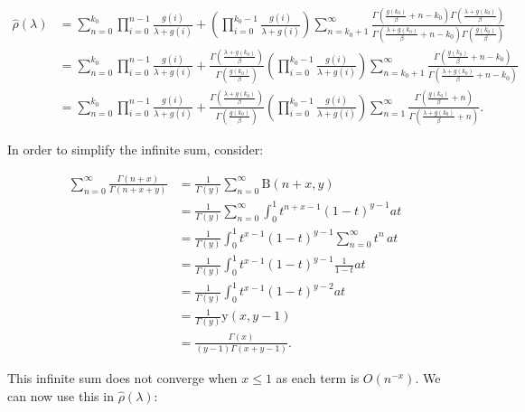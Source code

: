 \documentclass[
  sn-basic,
]{sn-jnl}
\theoremstyle{plain}
\theoremstyle{plain}
\theoremstyle{remark}
\begin{document}
\begin{align*}
\hat\rho(\lambda) &= \sum_{n=0}^{k_0}\prod_{i=0}^{n-1}\frac{g(i)}{\lambda+g(i)} + \left(\prod_{i=0}^{k_0-1}\frac{g(i)}{\lambda+g(i)}\right)\sum_{n=k_0+1}^\infty\frac{\Gamma\left(\frac{g(k_0)}{\beta}+n-k_0\right)\Gamma\left(\frac{\lambda+g(k_0)}{\beta}\right)}{\Gamma\left(\frac{\lambda+g(k_0)}{\beta}+n-k_0\right)\Gamma\left(\frac{g(k_0)}{\beta}\right)}\\
&= \sum_{n=0}^{k_0}\prod_{i=0}^{n-1}\frac{g(i)}{\lambda+g(i)} + \frac{\Gamma\left(\frac{\lambda+g(k_0)}{\beta}\right)}{\Gamma\left(\frac{g(k_0)}{\beta}\right)}\left(\prod_{i=0}^{k_0-1}\frac{g(i)}{\lambda+g(i)}\right)\sum_{n=k_0+1}^\infty\frac{\Gamma\left(\frac{g(k_0)}{\beta}+n-k_0\right)}{\Gamma\left(\frac{\lambda+g(k_0)}{\beta}+n-k_0\right)}\\
&=\sum_{n=0}^{k_0}\prod_{i=0}^{n-1}\frac{g(i)}{\lambda+g(i)} + \frac{\Gamma\left(\frac{\lambda+g(k_0)}{\beta}\right)}{\Gamma\left(\frac{g(k_0)}{\beta}\right)}\left(\prod_{i=0}^{k_0-1}\frac{g(i)}{\lambda+g(i)}\right)\sum_{n=1}^\infty\frac{\Gamma\left(\frac{g(k_0)}{\beta}+n\right)}{\Gamma\left(\frac{\lambda+g(k_0)}{\beta}+n\right)}.
\end{align*}

In order to simplify the infinite sum, consider:

\begin{align*}
\sum_{n=0}^\infty\frac{\Gamma(n+x)}{\Gamma(n+x+y)} &=\frac{1}{\Gamma(y)}\sum_{n=0}^\infty \text{B}(n+x,y)\\
&=\frac{1}{\Gamma(y)}\sum_{n=0}^\infty\int_0^1t^{n+x-1}(1-t)^{y-1}at\\
&=\frac{1}{\Gamma(y)}\int_0^1 t^{x-1}(1-t)^{y-1}\sum_{n=0}^\infty t^n\,at\\
&=\frac{1}{\Gamma(y)}\int_0^1 t^{x-1}(1-t)^{y-1}\frac{1}{1-t}at\\
&=\frac{1}{\Gamma(y)}\int_0^1 t^{x-1}(1-t)^{y-2}at\\
&=\frac{1}{\Gamma(y)}\text{y}(x,y-1)\\
&= \frac{\Gamma(x)}{(y-1)\Gamma(x+y-1)}.
\end{align*}

This infinite sum does not converge when \(x\le1\) as each term is
\(O(n^{-x})\). We can now use this in \(\hat\rho(\lambda)\):
\end{document}
